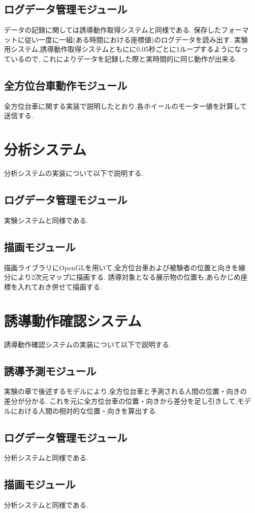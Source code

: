 \subsection{ログデータ管理モジュール}
データの記録に関しては誘導動作取得システムと同様である.
保存したフォーマットに従い一度に一組(ある時間における座標値)のログデータを読み出す.
実験用システム,誘導動作取得システムともにに0.05秒ごとに1ループするようになっているので,
これによりデータを記録した際と実時間的に同じ動作が出来る.

\subsection{全方位台車動作モジュール}
全方位台車に関する実装で説明したとおり,各ホイールのモーター値を計算して送信する.



\section{分析システム}
分析システムの実装について以下で説明する.

\subsection{ログデータ管理モジュール}
実験システムと同様である.

\subsection{描画モジュール}
描画ライブラリにOpenGLを用いて,全方位台車および被験者の位置と向きを線分により2次元マップに描画する.
誘導対象となる展示物の位置も,あらかじめ座標を入れておき併せて描画する.



\section{誘導動作確認システム}
誘導動作確認システムの実装について以下で説明する.


\subsection{誘導予測モジュール}
実験の章で後述するモデルにより,全方位台車と予測される人間の位置・向きの差分が分かる.
これを元に全方位台車の位置・向きから差分を足し引きして,モデルにおける人間の相対的な位置・向きを算出する.


\subsection{ログデータ管理モジュール}
分析システムと同様である.


\subsection{描画モジュール}
分析システムと同様である.

